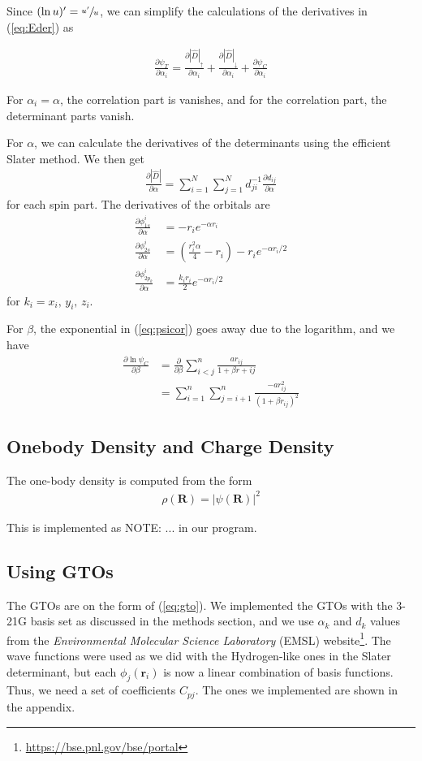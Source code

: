 \documentclass[twocolumns, a4paper,10pt,fleqn]{extarticle}
\newcommand{\eq}[1]{{\small\begin{align*}#1\end{align*}}}
\renewcommand\vec[1]{\boldsymbol{\mathbf{#1}}}
\newcommand{\op}[1]{\hat{#1}}
\begin{document}
Since $(\ln u)' = \sfrac{u'}{u}$, we can simplify the calculations of the derivatives
in (\ref{eq:Eder}) as

\eq{
  \frac{\partial \psi_T}{\partial \alpha_i}
  =\frac{\partial |\op D|_{\uparrow}}{\partial \alpha_i}
  +\frac{\partial |\op D|_{\downarrow}}{\partial \alpha_i}
  +\frac{\partial \psi_C}{\partial \alpha_i}
}

For $\alpha_i = \alpha$, the correlation part is vanishes,
and for the correlation part, the determinant parts vanish.

For $\alpha$, we can calculate the derivatives of the determinants 
using the efficient Slater method.
We then get
\eq{
  \frac{\partial|\op D|}{\partial \alpha}
  =\sum_{i=1}^N \sum_{j=1}^N  d_{ji}^{-1}\frac{\partial d_{ij}}{\partial \alpha}
}
for each spin part.
The derivatives of the orbitals are
\eq{
  \frac{\partial \phi_{1s}^i}{\partial \alpha} &= -r_i e^{-\alpha r_i}\\
  \frac{\partial \phi_{2s}^i}{\partial \alpha} &= 
  \left(
    \frac{r_i^2\alpha}{4}-r_i
  \right)-r_i e^{-\alpha r_i/2}\\
  \frac{\partial \phi_{2p_k}^i}{\partial \alpha} &= \frac{k_i r_i}{2}e^{-\alpha r_i/2}
}
for $k_i=x_i,\,y_i,\,z_i$.

For $\beta$, the exponential in (\ref{eq:psicor}) 
goes away due to the logarithm, and we have
\eq{
  \frac{\partial \ln \psi_C}{\partial \beta}
  &=\frac{\partial}{\partial \beta}\sum_{i<j}^n
    \frac{a r_{ij}}{1+\beta r+{ij}}\\
    &= \sum_{i=1}^n \sum_{j=i+1}^n \frac{-a r_{ij}^2}{(1+\beta r_{ij})^2}
}

\subsection{Onebody Density and Charge Density}
The one-body density is computed from the form 
{\small
\eq{
	\rho(\vec R) = |\psi(\vec R)|^2
}}%

This is implemented as NOTE: ... in our program. 

\subsection{Using GTOs}
The GTOs are on the form of (\ref{eq:gto}).
We implemented the GTOs with the 3-21G basis set as discussed in the
methods section, and we use $\alpha_k$ and $d_k$ values from the 
\textit{Environmental Molecular Science Laboratory} (EMSL) 
website\footnote{\url{https://bse.pnl.gov/bse/portal}}. The wave functions were used as
we did with the Hydrogen-like ones
in the Slater determinant, but each $\phi_j(\vec r_i)$ is now a linear combination
of basis functions. Thus, we need a set of coefficients $C_{pj}$.
The ones we implemented are shown in the appendix.
\end{document}
